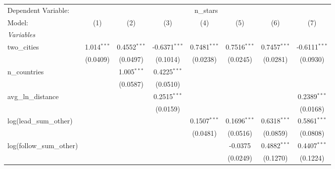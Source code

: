 
\begingroup
\centering
\begin{tabular}{lccccccc}
   \tabularnewline \midrule \midrule
   Dependent Variable: & \multicolumn{7}{c}{n\_stars}\\
   Model:                                                      & (1)           & (2)            & (3)             & (4)            & (5)            & (6)             & (7)\\  
   \midrule
   \emph{Variables}\\
   two\_cities                                                 & 1.014$^{***}$ & 0.4552$^{***}$ & -0.6371$^{***}$ & 0.7481$^{***}$ & 0.7516$^{***}$ & 0.7457$^{***}$  & -0.6111$^{***}$\\   
                                                               & (0.0409)      & (0.0497)       & (0.1014)        & (0.0238)       & (0.0245)       & (0.0281)        & (0.0930)\\   
   n\_countries                                                &               & 1.005$^{***}$  & 0.4225$^{***}$  &                &                &                 &   \\   
                                                               &               & (0.0587)       & (0.0510)        &                &                &                 &   \\   
   avg\_ln\_distance                                           &               &                & 0.2515$^{***}$  &                &                &                 & 0.2389$^{***}$\\   
                                                               &               &                & (0.0159)        &                &                &                 & (0.0168)\\   
   log(lead\_sum\_other)                                       &               &                &                 & 0.1507$^{***}$ & 0.1696$^{***}$ & 0.6318$^{***}$  & 0.5861$^{***}$\\   
                                                               &               &                &                 & (0.0481)       & (0.0516)       & (0.0859)        & (0.0808)\\   
   log(follow\_sum\_other)                                     &               &                &                 &                & -0.0375        & 0.4882$^{***}$  & 0.4407$^{***}$\\   
                                                               &               &                &                 &                & (0.0249)       & (0.1270)        & (0.1224)\\   

\end{tabular}
